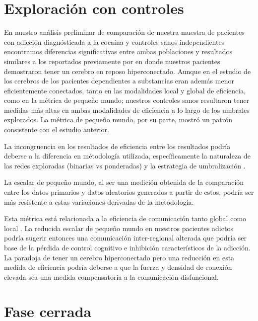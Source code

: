 \section{Exploración con controles}
En nuestro análisis preliminar de comparación de nuestra muestra de pacientes con adicción diagnósticada a la cocaína y controles sanos independientes encontramos diferencias significativas entre ambas poblaciones y resultados similares a los reportados previamente por \textcite{Wang2015a} en donde nuestros pacientes demostraron tener un cerebro en reposo hiperconectado. Aunque en el estudio de \textcite{Wang2015a} los cerebros de los pacientes dependientes a substancias eran además menor eficientemente conectados, tanto en las modalidades local y global de eficiencia, como en la métrica de pequeño mundo; nuestros controles sanos resultaron tener medidas más altas en ambas modalidades de eficiencia a lo largo de los umbrales explorados. La métrica de pequeño mundo, por su parte, mostró un patrón consistente con el estudio anterior. \par
La incongruencia en los resultados de eficiencia entre los resultados podría deberse a la diferencia en métodología utilizada, específicamente la naturaleza de las redes exploradas (binarias vs ponderadas) y la estrategia de umbralización \parencite{Hallquist2018}. \par
La escalar de pequeño mundo, al ser una medición obtenida de la comparación entre los datos primarios y datos aleatorios generados a partir de estos, podría ser más resistente a estas variaciones derivadas de la metodología. \par
Esta métrica está relacionada a la eficiencia de comunicación tanto global como local \parencite{Latora2001}. La reducida escalar de pequeño mundo en nuestros pacientes adictos podría sugerir entonces una comunicación inter-regional alterada que podría ser base de la pérdida de control cognitivo e inhibición característicos de la adicción. La paradoja de tener un cerebro hiperconectado pero una reducción en esta medida de eficiencia podría deberse a que la fuerza y densidad de conexión elevada sea una medida compensatoria a la comunicación disfuncional.

\section{Fase cerrada}
